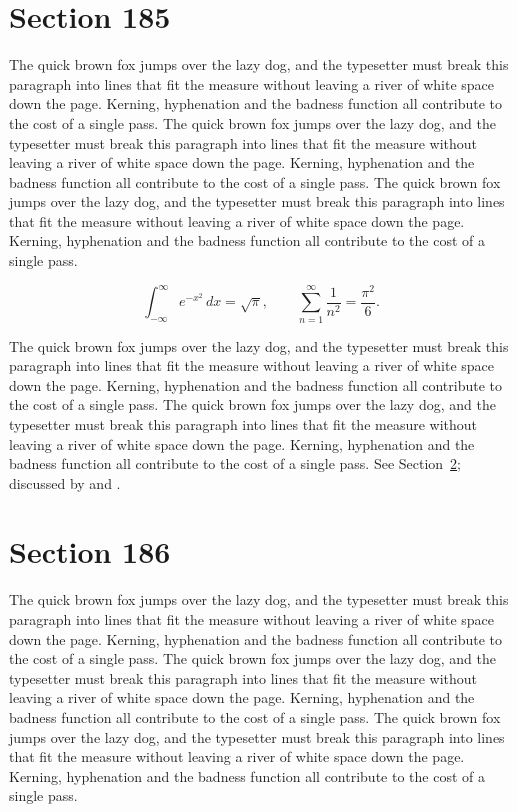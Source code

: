 \documentclass{article}
\begin{document}
\section{Section 185}
\label{sec:185}
The quick brown fox jumps over the lazy dog, and the typesetter must break this paragraph into lines that fit the measure without leaving a river of white space down the page. Kerning, hyphenation and the badness function all contribute to the cost of a single pass. The quick brown fox jumps over the lazy dog, and the typesetter must break this paragraph into lines that fit the measure without leaving a river of white space down the page. Kerning, hyphenation and the badness function all contribute to the cost of a single pass. The quick brown fox jumps over the lazy dog, and the typesetter must break this paragraph into lines that fit the measure without leaving a river of white space down the page. Kerning, hyphenation and the badness function all contribute to the cost of a single pass. 

\begin{equation}\label{eq:185}
\int_{-\infty}^{\infty} e^{-x^{2}}\,dx = \sqrt{\pi}, \qquad
\sum_{n=1}^{\infty} \frac{1}{n^{2}} = \frac{\pi^{2}}{6}.
\end{equation}

The quick brown fox jumps over the lazy dog, and the typesetter must break this paragraph into lines that fit the measure without leaving a river of white space down the page. Kerning, hyphenation and the badness function all contribute to the cost of a single pass. The quick brown fox jumps over the lazy dog, and the typesetter must break this paragraph into lines that fit the measure without leaving a river of white space down the page. Kerning, hyphenation and the badness function all contribute to the cost of a single pass. 
See Section~\ref{sec:186}; discussed by \textcite{k1} and \textcite{l3}.
\section{Section 186}
\label{sec:186}
The quick brown fox jumps over the lazy dog, and the typesetter must break this paragraph into lines that fit the measure without leaving a river of white space down the page. Kerning, hyphenation and the badness function all contribute to the cost of a single pass. The quick brown fox jumps over the lazy dog, and the typesetter must break this paragraph into lines that fit the measure without leaving a river of white space down the page. Kerning, hyphenation and the badness function all contribute to the cost of a single pass. The quick brown fox jumps over the lazy dog, and the typesetter must break this paragraph into lines that fit the measure without leaving a river of white space down the page. Kerning, hyphenation and the badness function all contribute to the cost of a single pass. 
\end{document}
